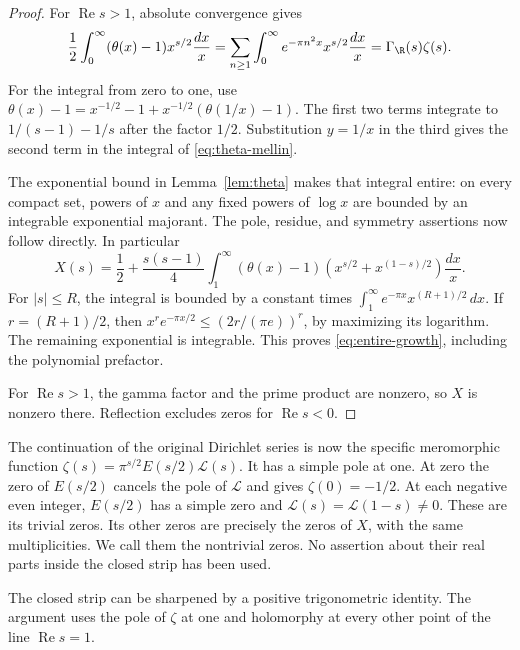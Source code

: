 \begin{proof}
For $\operatorname{Re}s>1$, absolute convergence gives
\[
 \frac12\int_0^\infty(\theta(x)-1)x^{s/2}\frac{dx}{x}
 =\sum_{n\geq1}\int_0^\infty e^{-\pi n^2x}x^{s/2}\frac{dx}{x}
 =\Gamma_{\R}(s)\zeta(s).
\]
For the integral from zero to one, use
$\theta(x)-1=x^{-1/2}-1+x^{-1/2}(\theta(1/x)-1)$.
The first two terms integrate to $1/(s-1)-1/s$ after the factor $1/2$.
Substitution $y=1/x$ in the third gives the second term in the integral
of \eqref{eq:theta-mellin}.

The exponential bound in Lemma~\ref{lem:theta} makes that integral entire:
on every compact set, powers of $x$ and any fixed powers of $\log x$ are
bounded by an integrable exponential majorant.
The pole, residue, and symmetry assertions now follow directly.
In particular
\[
 X(s)=\frac12+\frac{s(s-1)}4
       \int_1^\infty(\theta(x)-1)
             \left(x^{s/2}+x^{(1-s)/2}\right)\frac{dx}{x}.
\]
For $|s|\leq R$, the integral is bounded by a constant times
$\int_1^\infty e^{-\pi x}x^{(R+1)/2}\,dx$.
If $r=(R+1)/2$, then
$x^r e^{-\pi x/2}\leq(2r/(\pi e))^r$, by maximizing its logarithm.
The remaining exponential is integrable.  This proves
\eqref{eq:entire-growth}, including the polynomial prefactor.

For $\operatorname{Re}s>1$, the gamma factor and the prime product are
nonzero, so $X$ is nonzero there.  Reflection excludes zeros for
$\operatorname{Re}s<0$.
\end{proof}

The continuation of the original Dirichlet series is now the specific
meromorphic function $\zeta(s)=\pi^{s/2}E(s/2)\mathcal L(s)$.
It has a simple pole at one.  At zero the zero of $E(s/2)$ cancels the
pole of $\mathcal L$ and gives $\zeta(0)=-1/2$.
At each negative even integer, $E(s/2)$ has a simple zero and
$\mathcal L(s)=\mathcal L(1-s)\ne0$.
These are its trivial zeros.  Its other zeros are precisely the zeros of
$X$, with the same multiplicities.  We call them the nontrivial zeros.
No assertion about their real parts inside the closed strip has been used.

The closed strip can be sharpened by a positive trigonometric identity.
The argument uses the pole of $\zeta$ at one and holomorphy at every
other point of the line $\operatorname{Re}s=1$.

